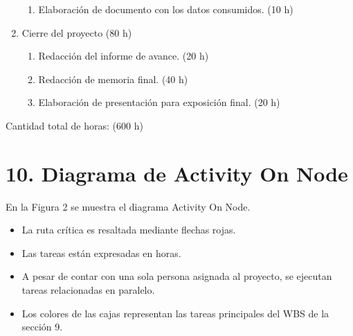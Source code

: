 \documentclass[
11pt, %
]{charter}
\begin{document}
\begin{enumerate}
\begin{enumerate}
			\item Elaboración de documento con los datos consumidos. (10 h)
		\end{enumerate}
	\item Cierre del proyecto (80 h)
		\begin{enumerate}
			\item Redacción del informe de avance. (20 h)
			\item Redacción de memoria final. (40 h)
			\item Elaboración de presentación para exposición final. (20 h) 
		\end{enumerate}
\end{enumerate}

Cantidad total de horas: (600 h)


\section{10. Diagrama de Activity On Node}
\label{sec:AoN}

En la Figura 2 se muestra el diagrama Activity On Node. 

\begin{itemize}
	\item La ruta crítica es resaltada mediante flechas rojas.
	\item Las tareas están expresadas en horas.
	\item A pesar de contar con una sola persona asignada al proyecto, se ejecutan tareas relacionadas en paralelo.
	\item Los colores de las cajas representan las tareas principales del WBS de la sección 9.
\end{itemize}



\end{document}
